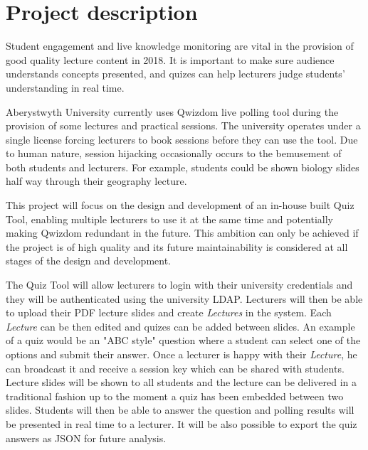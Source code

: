 \documentclass[11pt,fleqn,twoside]{article}
\begin{document}
\wordcount{}

\mmp

\setcounter{tocdepth}{3} %

\section{Project description}
Student engagement and live knowledge monitoring are vital in the provision of good quality
lecture content in 2018. It is important to make sure audience understands concepts presented,
and quizes can help lecturers judge students' understanding in real time.

Aberystwyth University currently uses Qwizdom live polling tool during the provision
of some lectures and practical sessions. The university operates under a single license
forcing lecturers to book sessions before they can use the tool. Due to human nature,
session hijacking occasionally occurs to the bemusement of both students and lecturers.
For example, students could be shown biology slides half way through their geography
lecture.

This project will focus on the design and development of an in-house built Quiz Tool,
enabling multiple lecturers to use it at the same time and potentially making Qwizdom
redundant in the future. This ambition can only be achieved if the project is of
high quality and its future maintainability is considered at all stages of the design
and development.

The Quiz Tool will allow lecturers to login with their university credentials and
they will be authenticated using the university LDAP. Lecturers will then
be able to upload their PDF lecture slides and create \textit{Lectures} in the system.
Each \textit{Lecture} can be then edited and quizes can be added between slides.
An example of a quiz would be an "ABC style" question where a student can select
one of the options and submit their answer. Once a lecturer is happy with their
\textit{Lecture}, he can broadcast it and receive a session key which can be
shared with students. Lecture slides will be shown to all students and the
lecture can be delivered in a traditional fashion up to the moment a quiz
has been embedded between two slides. Students will then be able to answer
the question and polling results will be presented in real time to a lecturer.
It will be also possible to export the quiz answers as JSON for future analysis.
\end{document}
